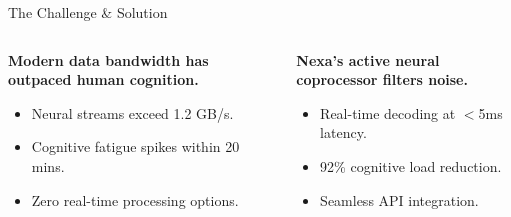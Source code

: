 \documentclass[aspectratio=169, xcolor={table}]{beamer}
\begin{document}
\begin{frame}{The Challenge \& Solution}
    \begin{columns}[T]
        \begin{column}{0.48\textwidth}
            \begin{tcolorbox}[
                enhanced,
                colback=brandOrange!10,
                colframe=brandOrange,
                title={\large\color{white}\faExclamationTriangle\quad The Bottleneck},
                coltitle=white,
                fonttitle=\bfseries,
                arc=4pt,
                outer arc=4pt,
                boxrule=1.5pt,
                toptitle=1.5mm,
                bottomtitle=1.5mm,
                top=2mm,
                bottom=2mm,
                left=3mm,
                right=3mm
            ]
                {\bfseries Modern data bandwidth has outpaced human cognition.}
                \begin{itemize}
                    \item Neural streams exceed 1.2 GB/s.
                    \item Cognitive fatigue spikes within 20 mins.
                    \item Zero real-time processing options.
                \end{itemize}
            \end{tcolorbox}
        \end{column}
        \hfill
        \begin{column}{0.48\textwidth}
            \begin{tcolorbox}[
                enhanced,
                colback=brandTeal!10,
                colframe=brandTeal,
                title={\large\color{white}\faLightbulb\quad Nexa Coprocessor},
                coltitle=white,
                fonttitle=\bfseries,
                arc=4pt,
                outer arc=4pt,
                boxrule=1.5pt,
                toptitle=1.5mm,
                bottomtitle=1.5mm,
                top=2mm,
                bottom=2mm,
                left=3mm,
                right=3mm
            ]
                {\bfseries Nexa's active neural coprocessor filters noise.}
                \begin{itemize}
                    \item Real-time decoding at $<$5ms latency.
                    \item 92\% cognitive load reduction.
                    \item Seamless API integration.
                \end{itemize}
            \end{tcolorbox}
        \end{column}
    \end{columns}
\end{frame}
\end{document}
